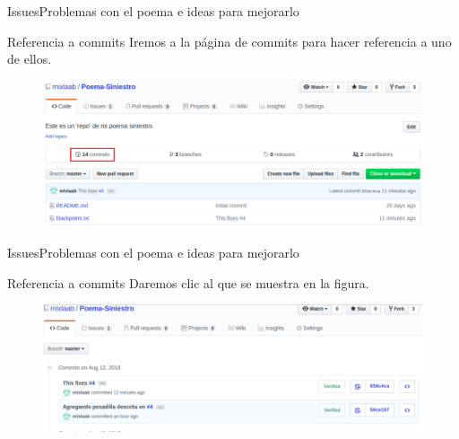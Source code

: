 \documentclass[10pt]{beamer}
\begin{document}
\begin{frame}{Issues}{Problemas con el poema e ideas para mejorarlo}

\begin{block}{Referencia a commits}
Iremos a la página de commits para hacer referencia a uno de ellos.
\vspace{0.1in}
\begin{figure}[h!]
\centering
\includegraphics [scale=0.33]{commits}
\label{fig:first}
\end{figure}
    
\end{block}

\end{frame}

\begin{frame}{Issues}{Problemas con el poema e ideas para mejorarlo}

\begin{block}{Referencia a commits}
Daremos clic al que se muestra en la figura.
\vspace{0.1in}
\begin{figure}[h!]
\centering
\includegraphics [scale=0.35]{commits2}
\label{fig:first}
\end{figure}
    
\end{block}

\end{frame}
\end{document}
